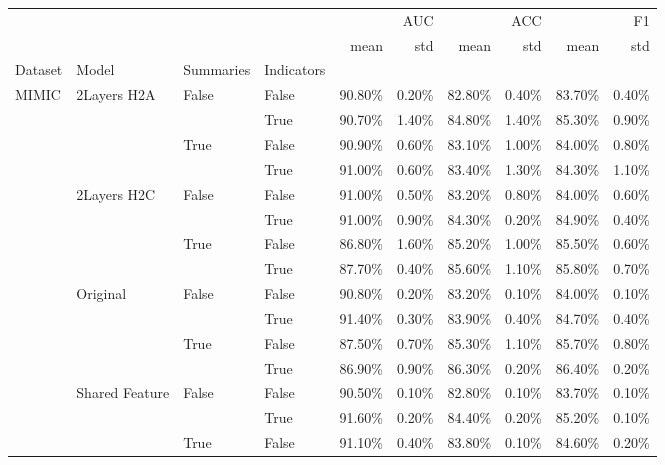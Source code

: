\begin{tabular}{llllrrrrrr}
\toprule
 &  &  &  & \multicolumn{2}{r}{AUC} & \multicolumn{2}{r}{ACC} & \multicolumn{2}{r}{F1} \\
 &  &  &  & mean & std & mean & std & mean & std \\
Dataset & Model & Summaries & Indicators &  &  &  &  &  &  \\
\midrule
\multirow[t]{20}{*}{MIMIC} & \multirow[t]{4}{*}{2Layers H2A} & \multirow[t]{2}{*}{False} & False & 90.80\% & 0.20\% & 82.80\% & 0.40\% & 83.70\% & 0.40\% \\
 &  &  & True & 90.70\% & 1.40\% & 84.80\% & 1.40\% & 85.30\% & 0.90\% \\
\cline{3-10}
 &  & \multirow[t]{2}{*}{True} & False & 90.90\% & 0.60\% & 83.10\% & 1.00\% & 84.00\% & 0.80\% \\
 &  &  & True & 91.00\% & 0.60\% & 83.40\% & 1.30\% & 84.30\% & 1.10\% \\
\cline{2-10} \cline{3-10}
 & \multirow[t]{4}{*}{2Layers H2C} & \multirow[t]{2}{*}{False} & False & 91.00\% & 0.50\% & 83.20\% & 0.80\% & 84.00\% & 0.60\% \\
 &  &  & True & 91.00\% & 0.90\% & 84.30\% & 0.20\% & 84.90\% & 0.40\% \\
\cline{3-10}
 &  & \multirow[t]{2}{*}{True} & False & 86.80\% & 1.60\% & 85.20\% & 1.00\% & 85.50\% & 0.60\% \\
 &  &  & True & 87.70\% & 0.40\% & 85.60\% & 1.10\% & 85.80\% & 0.70\% \\
\cline{2-10} \cline{3-10}
 & \multirow[t]{4}{*}{Original} & \multirow[t]{2}{*}{False} & False & 90.80\% & 0.20\% & 83.20\% & 0.10\% & 84.00\% & 0.10\% \\
 &  &  & True & 91.40\% & 0.30\% & 83.90\% & 0.40\% & 84.70\% & 0.40\% \\
\cline{3-10}
 &  & \multirow[t]{2}{*}{True} & False & 87.50\% & 0.70\% & 85.30\% & 1.10\% & 85.70\% & 0.80\% \\
 &  &  & True & 86.90\% & 0.90\% & 86.30\% & 0.20\% & 86.40\% & 0.20\% \\
\cline{2-10} \cline{3-10}
 & \multirow[t]{4}{*}{Shared Feature} & \multirow[t]{2}{*}{False} & False & 90.50\% & 0.10\% & 82.80\% & 0.10\% & 83.70\% & 0.10\% \\
 &  &  & True & 91.60\% & 0.20\% & 84.40\% & 0.20\% & 85.20\% & 0.10\% \\
\cline{3-10}
 &  & \multirow[t]{2}{*}{True} & False & 91.10\% & 0.40\% & 83.80\% & 0.10\% & 84.60\% & 0.20\% \\

\end{tabular}

